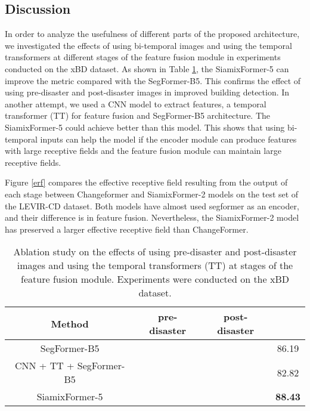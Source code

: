 \documentclass{article}
\begin{document}
\subsection{Discussion}
In order to analyze the usefulness of different parts of the proposed architecture, we investigated the effects of using bi-temporal images and using the temporal transformers at different stages of the feature fusion module in experiments conducted on the xBD dataset. As shown in Table \ref{table5}, the SiamixFormer-5 can improve  the  metric compared with the SegFormer-B5. This confirms the effect of using pre-disaster and post-disaster images in improved building detection. In another attempt, we used a CNN model to extract features, a temporal transformer (TT) for feature fusion and SegFormer-B5 architecture. The SiamixFormer-5 could achieve  better  than this model. This shows that using bi-temporal inputs can help the model if the encoder module can produce features with large receptive fields and the feature fusion module can maintain large receptive fields.

Figure \ref{erf} compares the effective receptive field resulting from the output of each stage between Changeformer and SiamixFormer-2 models on the test set of the LEVIR-CD dataset. Both models have almost used segformer as an encoder, and their difference is in feature fusion. Nevertheless, the SiamixFormer-2 model has preserved a larger effective receptive field than ChangeFormer.


\begin{table}[h!]
	\begin{center}
		\caption{Ablation study on the effects of using pre-disaster and post-disaster images and using the temporal transformers (TT) at stages of the feature fusion module. Experiments were conducted on the xBD dataset.} 
		\label{table5}
		\begin{tabular}{c|cc|c}
			\hline
			\hline
			Method & pre-disaster & post-disaster &  \\
			\hline
			SegFormer-B5 & \checkmark &  & 86.19 \\
			CNN + TT + SegFormer-B5 & \checkmark & \checkmark & 82.82 \\
			SiamixFormer-5 & \checkmark & \checkmark & \textbf{88.43} \\
			\hline
			\hline			
		\end{tabular}  
	\end{center}
\end{table}
   
\end{document}
